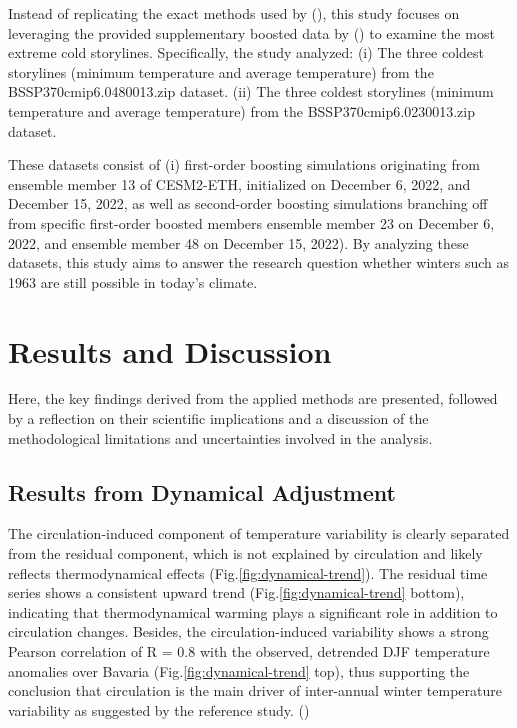 \documentclass[
]{krantz}
\begin{document}
Instead of replicating the exact methods used by (\citet{sippel2024}), this study focuses on leveraging the provided supplementary boosted data by (\citet{sippel2024}) to examine the most extreme cold storylines. Specifically, the study analyzed:
(i) The three coldest storylines (minimum temperature and average temperature) from the BSSP370cmip6.0480013.zip dataset.
(ii) The three coldest storylines (minimum temperature and average temperature) from the BSSP370cmip6.0230013.zip dataset.

These datasets consist of (i) first-order boosting simulations originating from ensemble member 13 of CESM2-ETH, initialized on December 6, 2022, and December 15, 2022, as well as second-order boosting simulations branching off from specific first-order boosted members ensemble member 23 on December 6, 2022, and ensemble member 48 on December 15, 2022). By analyzing these datasets, this study aims to answer the research question whether winters such as 1963 are still possible in today's climate.

\section{Results and Discussion}\label{results-and-discussion}

Here, the key findings derived from the applied methods are presented, followed by a reflection on their scientific implications and a discussion of the methodological limitations and uncertainties involved in the analysis.

\subsection{Results from Dynamical Adjustment}\label{results-from-dynamical-adjustment}

The circulation-induced component of temperature variability is clearly separated from the residual component, which is not explained by circulation and likely reflects thermodynamical effects (Fig.\ref{fig:dynamical-trend}). The residual time series shows a consistent upward trend (Fig.\ref{fig:dynamical-trend} bottom), indicating that thermodynamical warming plays a significant role in addition to circulation changes. Besides, the circulation-induced variability shows a strong Pearson correlation of R = 0.8 with the observed, detrended DJF temperature anomalies over Bavaria (Fig.\ref{fig:dynamical-trend} top), thus supporting the conclusion that circulation is the main driver of inter-annual winter temperature variability as suggested by the reference study. (\citet{sippel2024})
\end{document}
